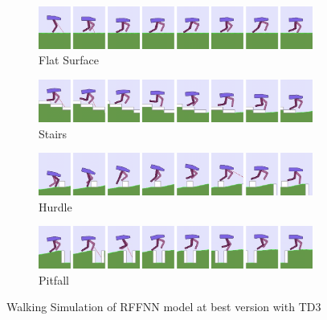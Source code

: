 \begin{figure}
	\centering
	\begin{subfigure}{.9\textwidth}
		\centering
		\includegraphics[width=0.99\textwidth]{figures/bipedal/anim/ff_flat.png}
		\caption{Flat Surface}
		\label{fig:anim_rffnn_flat}
	\end{subfigure}
	\begin{subfigure}{.9\textwidth}
		\centering
		\includegraphics[width=0.99\textwidth]{figures/bipedal/anim/ff_stairs.png}
		\caption{Stairs}
		\label{fig:anim_rffnn_stairs}
	\end{subfigure}
	\begin{subfigure}{.9\textwidth}
		\centering
		\includegraphics[width=0.99\textwidth]{figures/bipedal/anim/ff_hurdle.png}
		\caption{Hurdle}
		\label{fig:anim_rffnn_hurdle}
	\end{subfigure}
	\begin{subfigure}{.9\textwidth}
		\centering
		\includegraphics[width=0.99\textwidth]{figures/bipedal/anim/ff_pitfall.png}
		\caption{Pitfall}
		\label{fig:anim_rffnn_pitfall}
	\end{subfigure}
	\caption{Walking Simulation of RFFNN model at best version with TD3}
	\label{fig:rffnn_simulation}
\end{figure}

